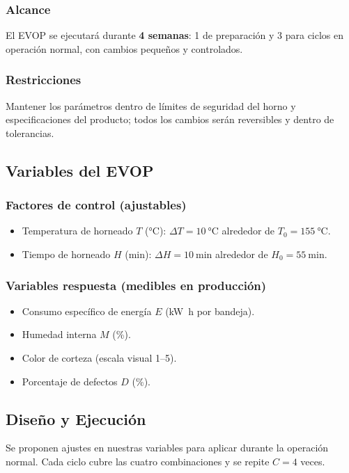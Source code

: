 \subsubsection*{Alcance }
El EVOP se ejecutará durante \textbf{4 semanas}: 1 de preparación y 3 para ciclos en operación normal, con cambios pequeños y controlados.

\subsubsection*{Restricciones}
Mantener los parámetros dentro de límites de seguridad del horno y especificaciones del producto; todos los cambios serán reversibles y dentro de tolerancias.

\subsection{Variables del EVOP}
\subsubsection*{Factores de control (ajustables)}
\begin{itemize}
  \item Temperatura de horneado $T$ (\si{\celsius}):  $\Delta T={\SI{10}{\celsius}}$ alrededor de $T_0={\SI{155}{\celsius}}$.
  \item Tiempo de horneado $H$ (\si{\minute}): $\Delta H={\SI{10}{\minute}}$ alrededor de $H_0={\SI{55}{\minute}}$.
\end{itemize}

\subsubsection*{Variables respuesta (medibles en producción)}
\begin{itemize}[left=0pt]
  \item Consumo específico de energía $E$ (\si{\kilo\watt\hour} por bandeja).
  \item Humedad interna $M$ (\si{\percent}).
  \item Color de corteza (escala visual 1--5).
  \item Porcentaje de defectos $D$ (\si{\percent}).
\end{itemize}

\subsection{Diseño y Ejecución}
Se proponen ajustes en nuestras variables para aplicar durante la operación normal. Cada ciclo cubre las cuatro combinaciones y se repite $C={4}$ veces.

